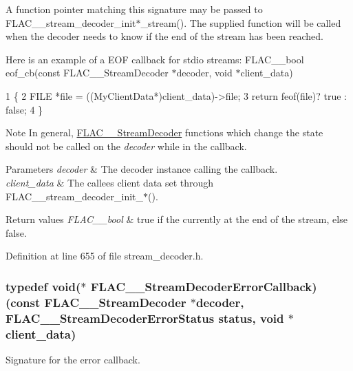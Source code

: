 A function pointer matching this signature may be passed to F\+L\+A\+C\+\_\+\+\_\+stream\+\_\+decoder\+\_\+init$\ast$\+\_\+stream(). The supplied function will be called when the decoder needs to know if the end of the stream has been reached.

Here is an example of a E\+OF callback for stdio streams\+: F\+L\+A\+C\+\_\+\+\_\+bool eof\+\_\+cb(const F\+L\+A\+C\+\_\+\+\_\+\+Stream\+Decoder $\ast$decoder, void $\ast$client\+\_\+data) 
\begin{DoxyCode}
1 \{
2   FILE *file = ((MyClientData*)client\_data)->file;
3   return feof(file)? true : false;
4 \}
\end{DoxyCode}


\begin{DoxyNote}{Note}
In general, \hyperlink{struct_f_l_a_c_____stream_decoder}{F\+L\+A\+C\+\_\+\+\_\+\+Stream\+Decoder} functions which change the state should not be called on the {\itshape decoder} while in the callback.
\end{DoxyNote}

\begin{DoxyParams}{Parameters}
{\em decoder} & The decoder instance calling the callback. \\
\hline
{\em client\+\_\+data} & The callee\textquotesingle{}s client data set through F\+L\+A\+C\+\_\+\+\_\+stream\+\_\+decoder\+\_\+init\+\_\+$\ast$(). \\
\hline
\end{DoxyParams}

\begin{DoxyRetVals}{Return values}
{\em F\+L\+A\+C\+\_\+\+\_\+bool} & {\ttfamily true} if the currently at the end of the stream, else {\ttfamily false}. \\
\hline
\end{DoxyRetVals}


Definition at line 655 of file stream\+\_\+decoder.\+h.

\subsubsection[{\texorpdfstring{F\+L\+A\+C\+\_\+\+\_\+\+Stream\+Decoder\+Error\+Callback}{FLAC__StreamDecoderErrorCallback}}]{\setlength{\rightskip}{0pt plus 5cm}typedef {\bf void}($\ast$ F\+L\+A\+C\+\_\+\+\_\+\+Stream\+Decoder\+Error\+Callback) ({\bf const} {\bf F\+L\+A\+C\+\_\+\+\_\+\+Stream\+Decoder} $\ast$decoder, {\bf F\+L\+A\+C\+\_\+\+\_\+\+Stream\+Decoder\+Error\+Status} {\bf status}, {\bf void} $\ast$client\+\_\+data)}\hypertarget{group__flac__stream__decoder_gac896ee6a12668e9015fab4fbc6aae996}{}\label{group__flac__stream__decoder_gac896ee6a12668e9015fab4fbc6aae996}
Signature for the error callback.

